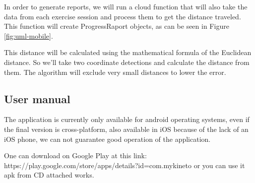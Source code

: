 In order to generate reports, we will run a cloud function that will also take the data from each exercise session and process them to get the distance traveled. This function will create ProgressRaport objects, as can be seen in Figure \ref{fig:uml-mobile}.

This distance will be calculated using the mathematical formula of the Euclidean distance.
So we'll take two coordinate detections and calculate the distance from them. The algorithm will exclude very small distances to lower the error.


\subsection{User manual}



The application is currently only available for
android operating systems, even if the final version is
cross-platform, also available in iOS because of
the lack of an iOS phone, we can not guarantee
good operation of the application. 

One can download on Google Play
at this link: https://play.google.com/store/apps/details?id=com.mykineto
or you can use it apk from CD attached works.

